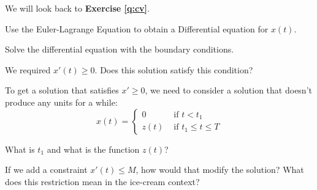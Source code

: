 \begin{slide}
	

\question

We will look back to \textbf{Exercise \ref{q:cv}}.

\begin{parts}
	\item Use the Euler-Lagrange Equation to obtain a Differential equation for $x(t)$.
		
	\item Solve the differential equation with the boundary conditions.
		
	\item We required $x'(t) \geq 0$. Does this solution satisfy this condition?
	
	\item To get a solution that satisfies $x'\geq 0$, we need to consider a solution that doesn't produce any units for a while: 
	\[ x(t) = \begin{cases}
 			0 & \text{ if } t < t_1 \\
 			z(t) & \text{ if } t_1 \leq t \leq T
	 \end{cases}
	 \]
	 
	 What is $t_1$ and what is the function $z(t)$?	
	
	\item If we add a constraint $x'(t) \leq M$, how would that modify the solution? What does this restriction mean in the ice-cream context?
	
\end{parts}
\end{slide}



